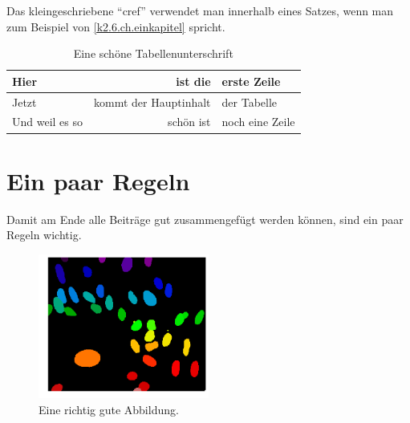 \documentclass{dsadokumentation}
\begin{document}
Das kleingeschriebene \enquote{cref} verwendet man innerhalb eines Satzes, wenn man zum Beispiel von \cref{k2.6.ch.einkapitel} spricht.

\begin{table}
	\centering
	\begin{tabular}{lrl}
		\toprule
		Hier           & ist die               & erste Zeile     \\\midrule
		Jetzt          & kommt der Hauptinhalt & der Tabelle     \\
		Und weil es so & schön ist             & noch eine Zeile \\
		\bottomrule
	\end{tabular}
	\caption{Eine schöne Tabellenunterschrift}
	\label{k2.6.tab.bestetabelle}
\end{table}

\section{Ein paar Regeln}
Damit am Ende alle Beiträge gut zusammengefügt werden können, sind ein paar Regeln wichtig.

\begin{figure}
	\centering
	\includegraphics[width=0.5\textwidth]{k2.6/exampleimage.png}
	\caption{Eine richtig gute Abbildung.}
	\label{k2.6.fig.meinefigure}
\end{figure}
\end{document}

